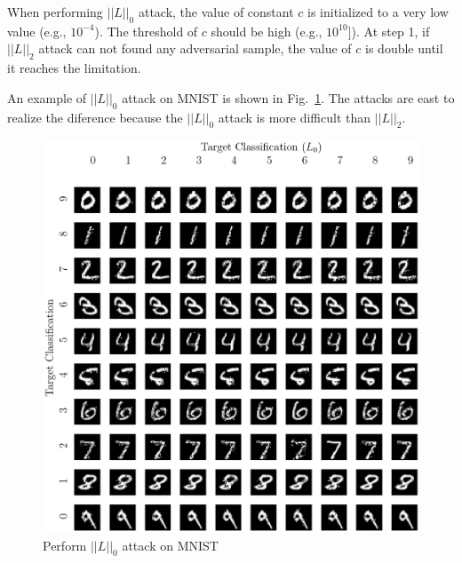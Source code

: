 \documentclass[12pt]{article}
\begin{document}
When performing $||L||_0$ attack, the value of constant $c$ is initialized to a very low value (e.g., $10^{-4}$). The threshold of $c$ should be high (e.g., $10^{10}]$). At step 1, if $||L||_2$ attack can not found any adversarial sample, the value of $c$ is double until it reaches the limitation.

An example of $||L||_0$ attack on MNIST is shown in Fig.~\ref{fig:L0-attack-sample}.
The attacks are east to realize the diference because the $||L||_0$ attack is more difficult than $||L||_2$.

\begin{figure}[H]
	\centering
	\label{fig:L0-attack-sample}
	\caption{Perform $||L||_0$ attack on MNIST}
	\includegraphics[scale=0.5]{img/L0-attack-sample}
\end{figure}

%
%
\end{document}
